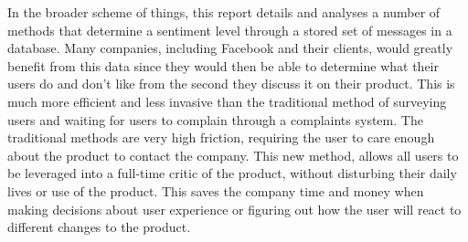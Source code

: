 In the broader scheme of things, this report details and analyses a number of methods that determine a sentiment level through a stored set of messages in a database.  Many companies, including Facebook and their clients, would greatly benefit from this data since they would then be able to determine what their users do and don't like from the second they discuss it on their product.  This is much more efficient and less invasive than the traditional method of surveying users and waiting for users to complain through a complaints system.  The traditional methods are very high friction, requiring the user to care enough about the product to contact the company.  This new method, allows all users to be leveraged into a full-time critic of the product, without disturbing their daily lives or use of the product. This saves the company time and money when making decisions about user experience or figuring out how the user will react to different changes to the product.
